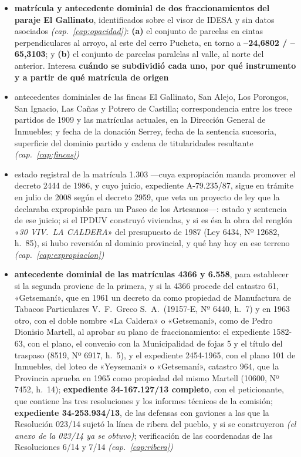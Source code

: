 \begin{itemize}[leftmargin=*]
\item \textbf{matrícula y antecedente dominial de dos fraccionamientos del paraje El Gallinato}, identificados sobre el visor de IDESA y sin datos asociados \textit{(cap.\ \ref{cap:opacidad})}: \textbf{(a)} el conjunto de parcelas en cintas perpendiculares al arroyo, al este del cerro Pucheta, en torno a \textbf{--24,6802 / --65,3103}; y \textbf{(b)} el conjunto de parcelas paralelas al valle, al norte del anterior. Interesa \textbf{cuándo se subdividió cada uno, por qué instrumento y a partir de qué matrícula de origen}
\item antecedentes dominiales de las fincas El Gallinato, San Alejo, Los Porongos, San
Ignacio, Las Cañas y Potrero de Castilla; correspondencia entre los trece partidos de 1909
y las matrículas actuales, en la Dirección General de Inmuebles; y fecha de la donación
Serrey, fecha de la sentencia sucesoria, superficie del dominio partido y cadena de
titularidades resultante \textit{(cap.\ \ref{cap:fincas})}
\item estado registral de la matrícula 1.303 ---cuya expropiación manda promover el decreto 2444 de 1986, y cuyo juicio, expediente A-79.235/87, sigue en trámite en julio de 2008 según el decreto 2959, que veta un proyecto de ley que la declaraba expropiable para un Paseo de los Artesanos---: estado y sentencia de ese juicio; si el IPDUV construyó viviendas, y si es ésa la obra del renglón «\textit{30 VIV.\ LA CALDERA}» del presupuesto de 1987 (Ley 6434, Nº 12682, h.\ 85), si hubo reversión al dominio provincial, y qué hay hoy en ese terreno \textit{(cap.\ \ref{cap:expropiacion})}
\item \textbf{antecedente dominial de las matrículas 4366 y 6.558}, para establecer si la segunda proviene de la primera, y si la 4366 procede del catastro 61, «Getsemaní», que en 1961 un decreto da como propiedad de Manufactura de Tabacos Particulares V.\ F.\ Greco S.\ A.\ (19157-E, Nº 6440, h.\ 7) y en 1963 otro, con el doble nombre «La Caldera» o «Getsemaní», como de Pedro Dionisio Martell, al aprobar su plano de fraccionamiento: el expediente 1582-63, con el plano, el convenio con la Municipalidad de fojas 5 y el título del traspaso (8519, Nº 6917, h.\ 5), y el expediente 2454-1965, con el plano 101 de Inmuebles, del loteo de «Yeysemani» o «Getsemaní», catastro 964, que la Provincia aprueba en 1965 como propiedad del mismo Martell (10600, Nº 7452, h.\ 14); \textbf{expediente 34-167.127/13 completo}, con el peticionante, que contiene las tres resoluciones y los informes técnicos de la comisión; \textbf{expediente 34-253.934/13}, de las defensas con gaviones a las que la Resolución 023/14 sujetó la línea de ribera del pueblo, y si se construyeron \textit{(el anexo de la 023/14 ya se obtuvo)}; verificación de las coordenadas de las Resoluciones 6/14 y 7/14 \textit{(cap.\ \ref{cap:ribera})}

\end{itemize}
